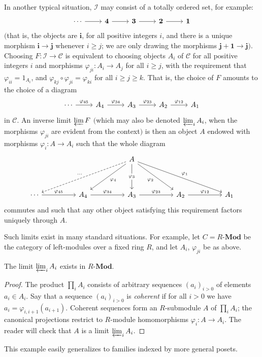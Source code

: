 \begin{example}
In another typical situation, $\mathcal{I}$ may consist of a totally ordered set, for example:
\[\begin{tikzcd}
\cdots\ar[r]&\bm{4}\ar[r]&\bm{3}\ar[r]&\bm{2}\ar[r]&\bm{1}
\end{tikzcd}\]
$($that is, the objects are $\bm{i}$, for all positive integers $i$, and there is a unique morphism
$\bm{i}\to \bm{j}$ whenever $i\geq j$; we are only drawing the morphisms $\bm{j}+\bm{1}\to \bm{j}$$)$. Choosing $F:\mathcal{I}\to\mathcal{C}$ is equivalent to choosing objects $A_i$ of $\mathcal{C}$ for all positive integers $i$ and morphisms $\varphi_{ji}:A_i\to A_j$ for all $i\geq j$, with the requirement that $\varphi_{ii}=1_{A_i}$, and $\varphi_{kj}\circ\varphi_{ji}=\varphi_{ki}$ for all $i\geq j\geq k$. That is, the choice of $F$ amounts to the choice of a diagram
\[\begin{tikzcd}
\cdots\ar[r,"\varphi_{45}"]&A_4\ar[r,"\varphi_{34}"]&A_3\ar[r,"\varphi_{23}"]&A_2\ar[r,"\varphi_{12}"]&A_1
\end{tikzcd}\]
in $\mathcal{C}$. An inverse limit $\varprojlim F$ $($which may also be denoted $\varprojlim_iA_i$, when the morphisms $\varphi_{ji}$ are evident from the context$)$ is then an object $A$ endowed with morphisms $\varphi_i:A\to A_i$ such that the whole diagram
\[\begin{tikzcd}
&&&&A\ar[lllldd,swap,dashed,"\cdots"]\ar[lldd,"\varphi_4"]\ar[dd,"\varphi_3" description]\ar[rrdd,swap,"\varphi_2"]\ar[rrrrdd,"\varphi_1"]&&&&\\
&&&&\\
\cdots\ar[rr,"\varphi_{45}"]&&A_4\ar[rr,"\varphi_{34}"]&&A_3\ar[rr,"\varphi_{23}"]&&A_2\ar[rr,"\varphi_{12}"]&&A_1
\end{tikzcd}\]
commutes and such that any other object satisfying this requirement factors uniquely through $A$.\par
Such limits exist in many standard situations. For example, let $C=R$-$\mathbf{Mod}$ be
the category of left-modules over a fixed ring $R$, and let $A_i$, $\varphi_{ji}$ be as above.
\begin{proposition}
The limit $\varprojlim_iA_i$ exists in $R$-$\mathbf{Mod}$.
\end{proposition}
\begin{proof}
The product $\prod_iA_i$ consists of arbitrary sequences $(a_i)_{i>0}$ of elements $a_i\in A_i$. Say that a sequence $(a_i)_{i>0}$ is \textit{coherent} if for all $i>0$ we have $a_i=\varphi_{i,i+1}(a_{i+1})$. Coherent sequences form an $R$-submodule $A$ of $\prod_iA_i$; the canonical projections restrict to $R$-module homomorphisms $\varphi_i:A\to A_i$. The reader will check that $A$ is a limit $\varprojlim_iA_i$.
\end{proof}
This example easily generalizes to families indexed by more general posets.
\end{example}
